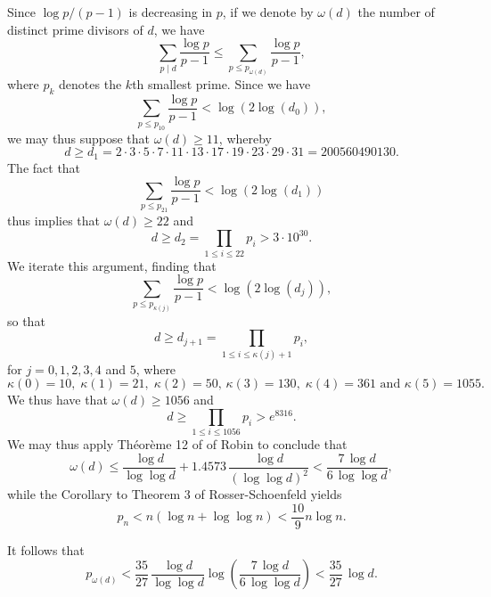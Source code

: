 {Since $\log p/ (p-1)$ is decreasing in $p$, if we denote by $\omega (d)$ the number of distinct prime divisors of $d$, we have
\begin{equation} \label{ome}
\sum_{p\mid d} \frac{\log p}{p-1} \leq \sum_{p \leq p_{\omega (d)}} \frac{\log p}{p-1},
\end{equation}
where $p_k$ denotes the $k$th smallest prime. Since we have
$$
 \sum_{p \leq p_{10}} \frac{\log p}{p-1} < \log (2 \log (d_0)),
 $$
 we may thus suppose that $\omega (d) \geq 11$, whereby 
 $$
 d \geq d_1 = 2 \cdot 3 \cdot 5 \cdot 7 \cdot 11 \cdot 13 \cdot 17 \cdot 19 \cdot 23 \cdot 29 \cdot 31 = 200560490130.
$$
The fact that
$$
 \sum_{p \leq p_{21}} \frac{\log p}{p-1} < \log (2 \log (d_1))
 $$
 thus implies that $\omega (d) \geq 22$ and
 $$
 d \geq d_2 = \prod_{1 \leq i \leq 22} p_i > 3 \cdot 10^{30}.
 $$
 We iterate this argument, finding that
 $$
 \sum_{p \leq p_{\kappa (j)}} \frac{\log p}{p-1} < \log (2 \log (d_j)),
 $$
 so that 
 $$
 d \geq d_{j+1} = \prod_{1 \leq i \leq \kappa (j) + 1} p_i,
 $$
for $j=0, 1, 2, 3, 4$ and $5$, where
 $$
 \kappa (0)=10, \; \kappa (1) = 21, \; \kappa (2) = 50, \, \kappa (3) = 130, \; \kappa (4) = 361 \mbox{ and } \kappa (5) = 1055.
 $$
We thus have that $\omega (d) \geq 1056$ and 
$$
d \geq \prod_{1 \leq i \leq 1056} p_i > e^{8316}.
$$
We may thus apply Th\'eor\`eme 12 of  of Robin \cite{Ro} to conclude that
$$
\omega (d) \leq \frac{\log d}{\log \log d} + 1.4573 \, \frac{\log d}{(\log \log d)^2}  <  \frac{7 \, \log d}{6 \, \log \log d},
$$
while the Corollary to Theorem 3 of Rosser-Schoenfeld yields 
$$
p_n < n (\log n + \log \log n) < \frac{10}{9} n \log n.
$$

It follows that
$$
p_{\omega (d)} < \frac{35}{27} \, \frac{\log d}{\log \log d} \log \left(  \frac{7 \, \log d}{6 \, \log \log d} \right) <  \frac{35}{27} \, \log d.
$$


}
